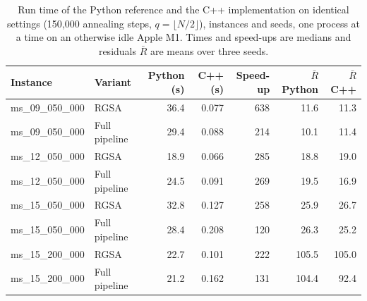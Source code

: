 \begin{table}[t]
\centering
\footnotesize
\caption{Run time of the Python reference and the C++ implementation on identical settings (150{,}000 annealing steps, $q=\lfloor N/2\rfloor$), instances and seeds, one process at a time on an otherwise idle Apple M1. Times and speed-ups are medians and residuals $\bar R$ are means over three seeds.}\label{tab:speed}
\begin{tabular}{llrrrrr}
\toprule
Instance & Variant & Python (s) & C++ (s) & Speed-up & $\bar R$ Python & $\bar R$ C++ \\
\midrule
ms\_09\_050\_000 & RGSA & 36.4 & 0.077 & 638 & 11.6 & 11.3 \\
ms\_09\_050\_000 & Full pipeline & 29.4 & 0.088 & 214 & 10.1 & 11.4 \\
ms\_12\_050\_000 & RGSA & 18.9 & 0.066 & 285 & 18.8 & 19.0 \\
ms\_12\_050\_000 & Full pipeline & 24.5 & 0.091 & 269 & 19.5 & 16.9 \\
ms\_15\_050\_000 & RGSA & 32.8 & 0.127 & 258 & 25.9 & 26.7 \\
ms\_15\_050\_000 & Full pipeline & 28.4 & 0.208 & 120 & 26.3 & 25.2 \\
ms\_15\_200\_000 & RGSA & 22.7 & 0.101 & 222 & 105.5 & 105.0 \\
ms\_15\_200\_000 & Full pipeline & 21.2 & 0.162 & 131 & 104.4 & 92.4 \\
\bottomrule
\end{tabular}
\end{table}
